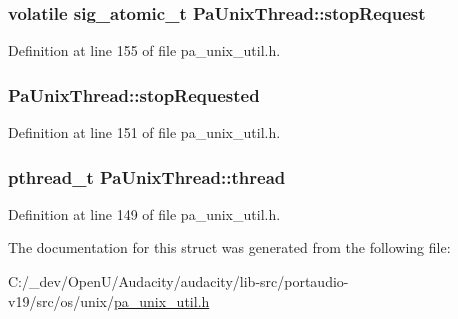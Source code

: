 \subsubsection[{\texorpdfstring{stop\+Request}{stopRequest}}]{\setlength{\rightskip}{0pt plus 5cm}volatile sig\+\_\+atomic\+\_\+t Pa\+Unix\+Thread\+::stop\+Request}\hypertarget{struct_pa_unix_thread_a32c4ee3320efe420b56a6ccf42097627}{}\label{struct_pa_unix_thread_a32c4ee3320efe420b56a6ccf42097627}


Definition at line 155 of file pa\+\_\+unix\+\_\+util.\+h.

\subsubsection[{\texorpdfstring{stop\+Requested}{stopRequested}}]{ Pa\+Unix\+Thread\+::stop\+Requested}\hypertarget{struct_pa_unix_thread_a2a258652e189a8f35af9726192713773}{}\label{struct_pa_unix_thread_a2a258652e189a8f35af9726192713773}


Definition at line 151 of file pa\+\_\+unix\+\_\+util.\+h.

\subsubsection[{\texorpdfstring{thread}{thread}}]{\setlength{\rightskip}{0pt plus 5cm}pthread\+\_\+t Pa\+Unix\+Thread\+::thread}\hypertarget{struct_pa_unix_thread_ad00e0ea927d1c0f830984c9d7c70d41b}{}\label{struct_pa_unix_thread_ad00e0ea927d1c0f830984c9d7c70d41b}


Definition at line 149 of file pa\+\_\+unix\+\_\+util.\+h.



The documentation for this struct was generated from the following file\+:\begin{DoxyCompactItemize}
\item 
C\+:/\+\_\+dev/\+Open\+U/\+Audacity/audacity/lib-\/src/portaudio-\/v19/src/os/unix/\hyperlink{pa__unix__util_8h}{pa\+\_\+unix\+\_\+util.\+h}\end{DoxyCompactItemize}
